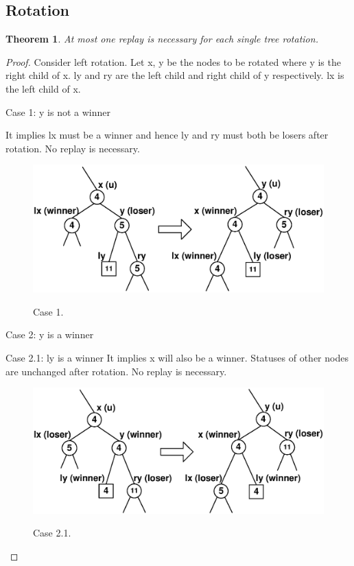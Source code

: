 \documentclass{acm_proc_article-sp}
\newtheorem{theorem}{Theorem}
\begin{document}
\subsection{Rotation}
\begin{theorem}
At most one replay is necessary for each single tree rotation.
\end{theorem}
\begin{proof} 
Consider left rotation. Let x, y be the nodes to
be rotated where y is the right child of x. ly and ry are the left
child and right child of y respectively. lx is the left child of x.

Case 1: y is not a winner

It implies lx must be a winner and hence ly and ry must both be
losers after rotation. No replay is necessary.

\begin{figure}[!h]
  \centering
  \includegraphics[scale=0.4]{case_1}\\
  \caption{Case 1.}\label{fig:case_1}
\end{figure}

Case 2: y is a winner

Case 2.1: ly is a winner It implies x will also be a winner.
Statuses of other nodes are unchanged after rotation. No replay is
necessary.
\begin{figure}[!h]
  \centering
  \includegraphics[scale=0.4]{case_2_1}\\
  \caption{Case 2.1.}\label{fig:case_2_1}
\end{figure}


\end{proof}
\end{document}
